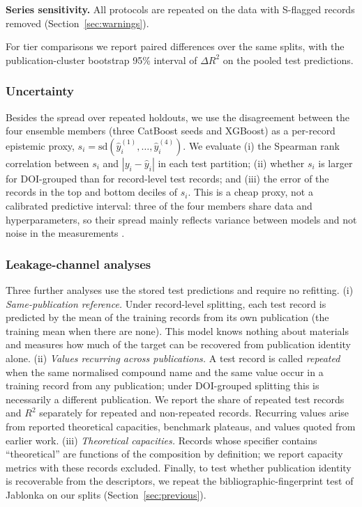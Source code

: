 \documentclass[journal=jcisd8,manuscript=article,layout=traditional]{achemso}
\begin{document}
\textbf{Series sensitivity.} All protocols are repeated on the data with S-flagged records removed (Section~\ref{sec:warnings}).

For tier comparisons we report paired differences over the same splits, with the publication-cluster bootstrap 95\% interval of $\Delta R^2$ on the pooled test predictions.

\subsubsection{Uncertainty}
\label{sec:uncertainty_methods}

Besides the spread over repeated holdouts, we use the disagreement between the four ensemble members (three CatBoost seeds and XGBoost) as a per-record epistemic proxy, $s_i = \mathrm{sd}(\hat y_i^{(1)},\ldots,\hat y_i^{(4)})$. We evaluate (i) the Spearman rank correlation between $s_i$ and $|y_i - \hat y_i|$ in each test partition; (ii) whether $s_i$ is larger for DOI-grouped than for record-level test records; and (iii) the error of the records in the top and bottom deciles of $s_i$. This is a cheap proxy, not a calibrated predictive interval: three of the four members share data and hyperparameters, so their spread mainly reflects variance between models and not noise in the measurements \cite{tran2020uq}.

\subsubsection{Leakage-channel analyses}
\label{sec:channels_methods}

Three further analyses use the stored test predictions and require no refitting. (i) \emph{Same-publication reference.} Under record-level splitting, each test record is predicted by the mean of the training records from its own publication (the training mean when there are none). This model knows nothing about materials and measures how much of the target can be recovered from publication identity alone. (ii) \emph{Values recurring across publications.} A test record is called \emph{repeated} when the same normalised compound name and the same value occur in a training record from any publication; under DOI-grouped splitting this is necessarily a different publication. We report the share of repeated test records and $R^2$ separately for repeated and non-repeated records. Recurring values arise from reported theoretical capacities, benchmark plateaus, and values quoted from earlier work. (iii) \emph{Theoretical capacities.} Records whose specifier contains ``theoretical'' are functions of the composition by definition; we report capacity metrics with these records excluded. Finally, to test whether publication identity is recoverable from the descriptors, we repeat the bibliographic-fingerprint test of Jablonka \cite{jablonka2026clever} on our splits (Section~\ref{sec:previous}).
\end{document}
